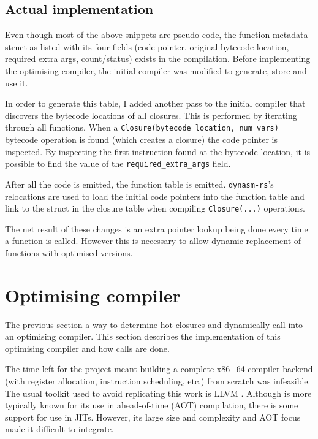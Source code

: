 \subsection{Actual implementation}

Even though most of the above snippets are pseudo-code, the function metadata struct as listed with
its four fields (code pointer, original bytecode location, required extra args, count/status)
exists in the compilation. Before implementing the optimising compiler, the initial compiler was
modified to generate, store and use it.

In order to generate this table, I added another pass to the initial compiler that discovers the
bytecode locations of all closures. This is performed by iterating through all functions. When a
\texttt{Closure(bytecode\_location, num\_vars)} bytecode operation is found (which creates a
closure) the code pointer is inspected. By inspecting the first instruction found at the bytecode
location, it is possible to find the value of the \texttt{required\_extra\_args} field.

After all the code is emitted, the function table is emitted. \texttt{dynasm-rs}'s relocations are
used to load the initial code pointers into the function table and link to the struct in the
closure table when compiling \texttt{Closure(...)} operations.

The net result of these changes is an extra pointer lookup being done every time a function is
called. However this is necessary to allow dynamic replacement of functions with optimised
versions.

\section{Optimising compiler} \label{opt-comp}

The previous section a way to determine hot closures and dynamically call
into an optimising compiler. This section describes the implementation of this optimising compiler
and how calls are done.

The time left for the project meant building a complete x86\_64 compiler backend (with register
allocation,
instruction scheduling, etc.) from scratch was infeasible. The usual toolkit used to avoid
replicating this work is LLVM \cite{llvm}. Although is more typically known for its use in
ahead-of-time (AOT) compilation, there is some support for use in JITs. However, its large size and
complexity and AOT focus made it difficult to integrate.

